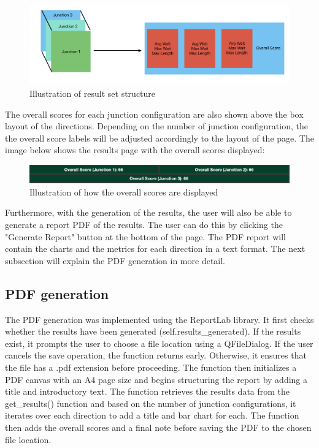 \documentclass{article}
\begin{document}
    \begin{figure}[H]
        \centering
        \includegraphics[width=\textwidth]{results3d}
        \caption{Illustration of result set structure}
        \label{fig:results3d}
    \end{figure}

    The overall scores for each junction configuration are also shown above the box layout of the directions. Depending on the number of junction configuration, the
    the overall score labels will be adjusted accordingly to the layout of the page. The image below shows the results page with the overall scores displayed:

    \begin{figure}[H]
        \centering
        \includegraphics[width=\textwidth]{overallScores}
        \caption{Illustration of how the overall scores are displayed}
        \label{fig:overallScores}
    \end{figure}

    Furthermore, with the generation of the results, the user will also be able to generate a report PDF of the results. The user can do this by clicking the "Generate Report" button at the bottom of the page.
    The PDF report will contain the charts and the metrics for each direction in a text format. The next subsection will explain the PDF generation in more detail.

    \subsection{PDF generation}

    The PDF generation was implemented using the ReportLab library. It first checks whether the results have been generated (self.results\_generated). If the results exist, it prompts the user to choose a file
    location using a QFileDialog. If the user cancels the save operation, the function returns early. Otherwise, it ensures that the file has a .pdf extension before proceeding. The function then initializes a
    PDF canvas with an A4 page size and begins structuring the report by adding a title and introductory text. The function retrieves the results data from the get\_results() function and based on the number of junction
    configurations, it iterates over each direction to add a title and bar chart for each. The function then adds the overall scores and a final note before saving the PDF to the chosen file location.
\end{document}
